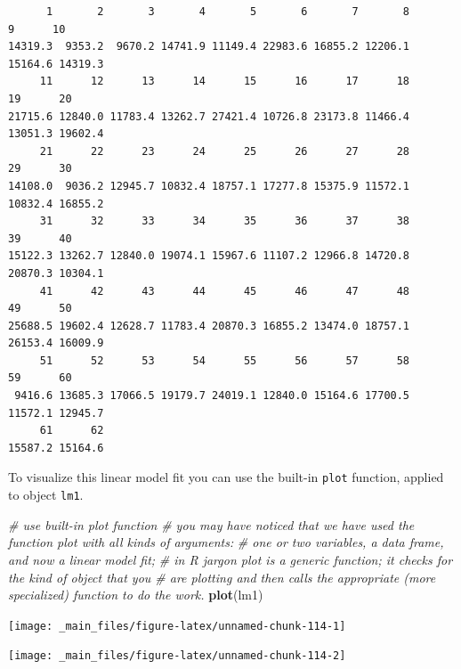 \documentclass[
]{book}
\newenvironment{Shaded}{\begin{snugshade}}{\end{snugshade}}
\newcommand{\CommentTok}[1]{\textcolor[rgb]{0.56,0.35,0.01}{\textit{#1}}}
\newcommand{\KeywordTok}[1]{\textcolor[rgb]{0.13,0.29,0.53}{\textbf{#1}}}
\newcommand{\NormalTok}[1]{#1}
\newcommand{\OperatorTok}[1]{\textcolor[rgb]{0.81,0.36,0.00}{\textbf{#1}}}
\begin{document}
\begin{Shaded}
\end{Shaded}

\begin{verbatim}
      1       2       3       4       5       6       7       8       9      10 
14319.3  9353.2  9670.2 14741.9 11149.4 22983.6 16855.2 12206.1 15164.6 14319.3 
     11      12      13      14      15      16      17      18      19      20 
21715.6 12840.0 11783.4 13262.7 27421.4 10726.8 23173.8 11466.4 13051.3 19602.4 
     21      22      23      24      25      26      27      28      29      30 
14108.0  9036.2 12945.7 10832.4 18757.1 17277.8 15375.9 11572.1 10832.4 16855.2 
     31      32      33      34      35      36      37      38      39      40 
15122.3 13262.7 12840.0 19074.1 15967.6 11107.2 12966.8 14720.8 20870.3 10304.1 
     41      42      43      44      45      46      47      48      49      50 
25688.5 19602.4 12628.7 11783.4 20870.3 16855.2 13474.0 18757.1 26153.4 16009.9 
     51      52      53      54      55      56      57      58      59      60 
 9416.6 13685.3 17066.5 19179.7 24019.1 12840.0 15164.6 17700.5 11572.1 12945.7 
     61      62 
15587.2 15164.6 
\end{verbatim}

To visualize this linear model fit you can use the built-in \texttt{plot} function, applied to object \texttt{lm1}.

\begin{Shaded}
\begin{Highlighting}[]
\CommentTok{# use built-in plot function}
\CommentTok{# you may have noticed that we have used the function plot with all kinds of arguments: }
\CommentTok{# one or two variables, a data frame, and now a linear model fit;}
\CommentTok{# in R jargon plot is a generic function; it checks for the kind of object that you # are plotting and then calls the appropriate (more specialized) function to do the work.}
\KeywordTok{plot}\NormalTok{(lm1)}
\end{Highlighting}
\end{Shaded}

\begin{center}\texttt{[image: \_main\_files/figure-latex/unnamed-chunk-114-1]} \end{center}

\begin{center}\texttt{[image: \_main\_files/figure-latex/unnamed-chunk-114-2]} \end{center}
\end{document}
